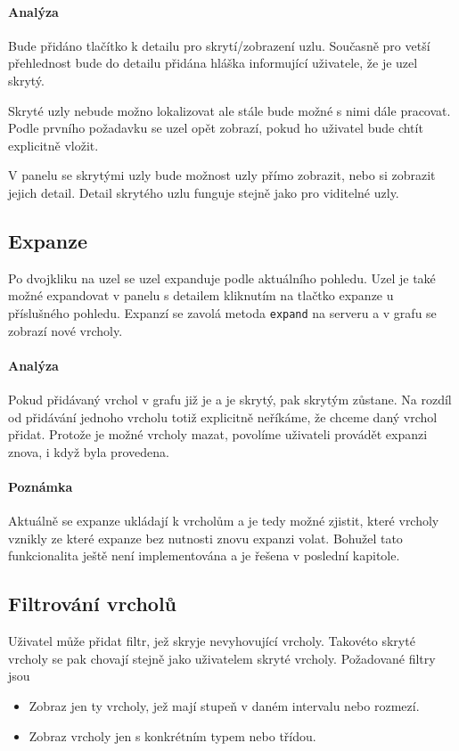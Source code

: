 \paragraph{Analýza} Bude přidáno tlačítko k detailu pro skrytí/zobrazení uzlu. Současně pro vetší přehlednost bude do detailu přidána hláška informující uživatele, že je uzel skrytý.

Skryté uzly nebude možno lokalizovat ale stále bude možné s nimi dále pracovat. Podle prvního požadavku se uzel opět zobrazí, pokud ho uživatel bude chtít explicitně vložit.

V panelu se skrytými uzly bude možnost uzly přímo zobrazit, nebo si zobrazit jejich detail. Detail skrytého uzlu funguje stejně jako pro viditelné uzly.

\subsection{Expanze}
Po dvojkliku na uzel se uzel expanduje podle aktuálního pohledu. Uzel je také možné expandovat v panelu s detailem kliknutím na tlačtko expanze u příslušného pohledu. Expanzí se zavolá metoda \texttt{expand} na serveru a v grafu se zobrazí nové vrcholy.

\paragraph{Analýza} Pokud přidávaný vrchol v grafu již je a je skrytý, pak skrytým zůstane. Na rozdíl od přidávání jednoho vrcholu totiž explicitně neříkáme, že chceme daný vrchol přidat. Protože je možné vrcholy mazat, povolíme uživateli provádět expanzi znova, i když byla provedena.

\paragraph{Poznámka} Aktuálně se expanze ukládají k vrcholům a je tedy možné zjistit, které vrcholy vznikly ze které expanze bez nutnosti znovu expanzi volat. Bohužel tato funkcionalita ještě není implementována a je řešena v poslední kapitole.

\subsection{Filtrování vrcholů}
Uživatel může přidat filtr, jež skryje nevyhovující vrcholy. Takovéto skryté vrcholy se pak chovají stejně jako uživatelem skryté vrcholy. Požadované filtry jsou
\begin{itemize}
    \item Zobraz jen ty vrcholy, jež mají stupeň v daném intervalu nebo rozmezí.
    \item Zobraz vrcholy jen s konkrétním typem nebo třídou.
\end{itemize}

